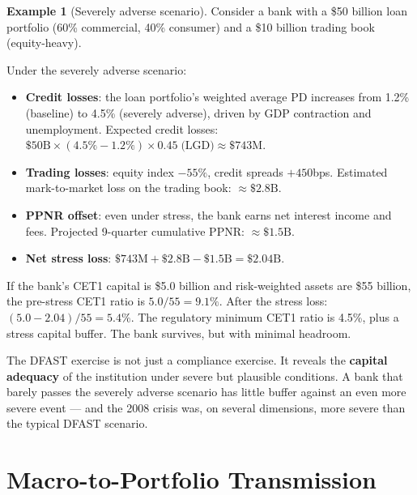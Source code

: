 \documentclass[11pt, a4paper]{article}
\theoremstyle{definition}
\newtheorem{example}{Example}[section]
\theoremstyle{plain}
\theoremstyle{remark}
\begin{document}
\begin{example}[Severely adverse scenario]\label{ex:dfast-severe}
Consider a bank with a \$50 billion loan portfolio (60\% commercial, 40\% consumer)
and a \$10 billion trading book (equity-heavy).

Under the severely adverse scenario:
\begin{itemize}
    \item \textbf{Credit losses}: the loan portfolio's weighted average PD increases from 1.2\%
          (baseline) to 4.5\% (severely adverse), driven by GDP contraction and unemployment.
          Expected credit losses: $\$50\text{B} \times (4.5\% - 1.2\%) \times 0.45 \;\text{(LGD)} \approx \$743\text{M}$.
    \item \textbf{Trading losses}: equity index $-55\%$, credit spreads $+450$bps.
          Estimated mark-to-market loss on the trading book: $\approx \$2.8\text{B}$.
    \item \textbf{PPNR offset}: even under stress, the bank earns net interest income and fees.
          Projected 9-quarter cumulative PPNR: $\approx \$1.5\text{B}$.
    \item \textbf{Net stress loss}: $\$743\text{M} + \$2.8\text{B} - \$1.5\text{B} = \$2.04\text{B}$.
\end{itemize}

If the bank's CET1 capital is \$5.0 billion and risk-weighted assets are \$55 billion,
the pre-stress CET1 ratio is $5.0 / 55 = 9.1\%$.
After the stress loss: $(5.0 - 2.04) / 55 = 5.4\%$.
The regulatory minimum CET1 ratio is 4.5\%, plus a stress capital buffer.
The bank survives, but with minimal headroom.
\end{example}

\begin{interpbox}
The DFAST exercise is not just a compliance exercise.
It reveals the \textbf{capital adequacy} of the institution under severe but plausible conditions.
A bank that barely passes the severely adverse scenario has little buffer against
an even more severe event --- and the 2008 crisis was, on several dimensions,
more severe than the typical DFAST scenario.
\end{interpbox}

\section{Macro-to-Portfolio Transmission}
\label{sec:transmission}
\end{document}
